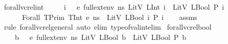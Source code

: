 \begin{isabellebody}
\isamarkupfalse%
%
\endisatagproof
{\isafoldproof}%
%
\isadelimproof
\isanewline
%
\endisadelimproof
\isanewline
{}\isamarkupfalse%
\ forall{\isacharunderscore}{\kern0pt}vc{\isacharunderscore}{\kern0pt}rel{\isacharunderscore}{\kern0pt}int{\isacharcolon}{\kern0pt}\ \isanewline
\ \ \ {\isachardoublequoteopen}{\isasymAnd}\ i{\isachardot}{\kern0pt}\ {\isasymLambda}{\isacharcomma}{\kern0pt}{\isasymGamma}{\isacharcomma}{\kern0pt}{\isasymOmega}\ {\isasymturnstile}\ {\isasymlangle}e{\isacharcomma}{\kern0pt}\ full{\isacharunderscore}{\kern0pt}ext{\isacharunderscore}{\kern0pt}env\ ns\ {\isacharparenleft}{\kern0pt}LitV\ {\isacharparenleft}{\kern0pt}LInt\ i{\isacharparenright}{\kern0pt}{\isacharparenright}{\kern0pt}{\isasymrangle}\ {\isasymDown}\ LitV\ {\isacharparenleft}{\kern0pt}LBool\ {\isacharparenleft}{\kern0pt}P\ i{\isacharparenright}{\kern0pt}{\isacharparenright}{\kern0pt}{\isachardoublequoteclose}\isanewline
\ \ \ \ {\isachardoublequoteopen}{\isasymLambda}{\isacharcomma}{\kern0pt}{\isasymGamma}{\isacharcomma}{\kern0pt}{\isasymOmega}\ {\isasymturnstile}\ {\isasymlangle}Forall\ {\isacharparenleft}{\kern0pt}TPrim\ TInt{\isacharparenright}{\kern0pt}\ e{\isacharcomma}{\kern0pt}\ ns{\isasymrangle}\ {\isasymDown}\ LitV\ {\isacharparenleft}{\kern0pt}LBool\ {\isacharparenleft}{\kern0pt}{\isasymforall}i{\isachardot}{\kern0pt}\ P\ i{\isacharparenright}{\kern0pt}{\isacharparenright}{\kern0pt}{\isachardoublequoteclose}\isanewline
%
\isadelimproof
\ \ %
\endisadelimproof
%
\isatagproof
{}\isamarkupfalse%
\ assms\isanewline
\ \ \isamarkupfalse%
\ {\isacharparenleft}{\kern0pt}rule\ forall{\isacharunderscore}{\kern0pt}vc{\isacharunderscore}{\kern0pt}rel{\isacharunderscore}{\kern0pt}general{\isacharcomma}{\kern0pt}\ auto\ elim{\isacharcolon}{\kern0pt}\ type{\isacharunderscore}{\kern0pt}of{\isacharunderscore}{\kern0pt}val{\isacharunderscore}{\kern0pt}int{\isacharunderscore}{\kern0pt}elim{\isacharparenright}{\kern0pt}%
\endisatagproof
{\isafoldproof}%
%
\isadelimproof
\isanewline
%
\endisadelimproof
\isanewline
{}\isamarkupfalse%
\ forall{\isacharunderscore}{\kern0pt}vc{\isacharunderscore}{\kern0pt}rel{\isacharunderscore}{\kern0pt}bool{\isacharcolon}{\kern0pt}\ \isanewline
\ \ \ {\isachardoublequoteopen}{\isasymAnd}\ b{\isachardot}{\kern0pt}\ {\isasymLambda}{\isacharcomma}{\kern0pt}{\isasymGamma}{\isacharcomma}{\kern0pt}{\isasymOmega}\ {\isasymturnstile}\ {\isasymlangle}e{\isacharcomma}{\kern0pt}\ full{\isacharunderscore}{\kern0pt}ext{\isacharunderscore}{\kern0pt}env\ ns\ {\isacharparenleft}{\kern0pt}LitV\ {\isacharparenleft}{\kern0pt}LBool\ b{\isacharparenright}{\kern0pt}{\isacharparenright}{\kern0pt}{\isasymrangle}\ {\isasymDown}\ LitV\ {\isacharparenleft}{\kern0pt}LBool\ {\isacharparenleft}{\kern0pt}P\ b{\isacharparenright}{\kern0pt}{\isacharparenright}{\kern0pt}{\isachardoublequoteclose}\isanewline

\end{isabellebody}
